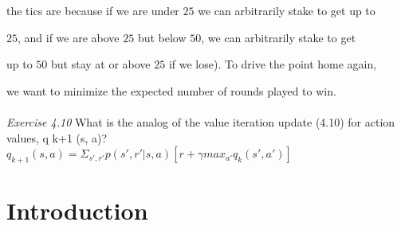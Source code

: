 \documentclass{article}
\begin{document}
the tics are because if we are under $25$ we can arbitrarily stake to get up to 

$25$, and if we are above $25$ but below $50$, we can arbitrarily stake to get 

up to $50$ but stay at or above $25$ if we lose). To drive the point home again, 

we want to minimize the expected number of rounds played to win.
\\\\
\textit{Exercise 4.10} What is the analog of the value iteration update (4.10) for action values,
q k+1 (s, a)?
\\

$q_{k+1}(s, a) = \Sigma_{s', r'}p(s', r'|s, a)[r + \gamma max_{a'}q_{k}(s', a')]$

\maketitle

\section{Introduction}
\end{document}
